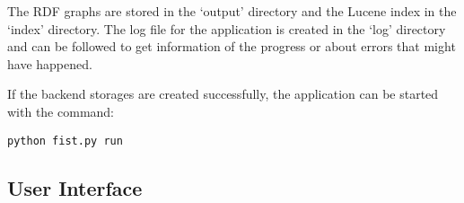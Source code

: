 \documentclass[a4paper,12pt]{article}
\begin{document}
\noindent The RDF graphs are stored in the `output' directory and the
Lucene index in the `index' directory. The log file for the
application is created in the `log' directory and can be followed to
get information of the progress or about errors that might have
happened.

If the backend storages are created successfully, the application can
be started with the command:

\begin{verbatim}
python fist.py run
\end{verbatim}

\subsection{User Interface}
\end{document}

